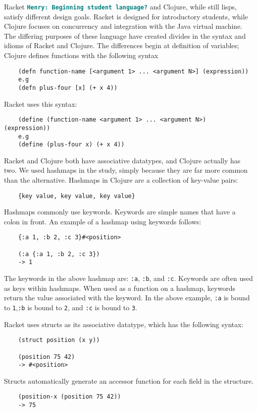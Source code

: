 \documentclass[12pt]{article}
\newcommand{\comment}[1]{{\bf \tt  {#1}}}
\newcommand{\hfcomment}[1]{\textcolor{Teal}{\comment{Henry: {#1}}}}
\begin{document}
Racket \hfcomment{Beginning student language?} and Clojure, while still lisps, satisfy different design goals. 
Racket is designed for introductory students, while Clojure focuses on concurrency and integration with the Java virtual machine. 
The differing purposes of these language have created divides in the syntax and idioms of Racket and Clojure.
 The differences begin at definition of variables; Clojure defines functions with the following syntax

\begin{verbatim}
	(defn function-name [<argument 1> ... <argument N>] (expression))
	e.g
	(defn plus-four [x] (+ x 4))
\end{verbatim}
Racket uses this syntax:
\begin{verbatim}
	(define (function-name <argument 1> ... <argument N>) (expression))
	e.g
	(define (plus-four x) (+ x 4))
\end{verbatim}

Racket and Clojure both have associative datatypes, and Clojure actually has two. We used hashmaps in the study, simply because they are far more common than the alternative.
Hashmaps in Clojure are a collection of key-value pairs: 

\begin{verbatim}
	{key value, key value, key value}
\end{verbatim}

Hashmaps commonly use keywords. Keywords are simple names that have a colon in front.
An example of a hashmap using keywords follows: 

\begin{verbatim}
	{:a 1, :b 2, :c 3}#<position>
	
	(:a {:a 1, :b 2, :c 3})
	-> 1
\end{verbatim}

The keywords in the above hashmap are: \texttt{:a}, \texttt{:b}, and \texttt{:c}.
Keywords are often used as keys within hashmaps. 
When used as a function on a hashmap, keywords return the value associated with the keyword. 
In the above example, \texttt{:a} is bound to \texttt{1},\texttt{:b} is bound to \texttt{2}, and \texttt{:c} is bound to \texttt{3}.


Racket uses structs as its associative datatype, which has the following syntax:
\begin{verbatim}
	(struct position (x y))
	
	(position 75 42)
	-> #<position>
\end{verbatim}
Structs automatically generate an accessor function for each field in the structure.
\begin{verbatim}
	(position-x (position 75 42))
	-> 75
\end{verbatim}
\end{document}
